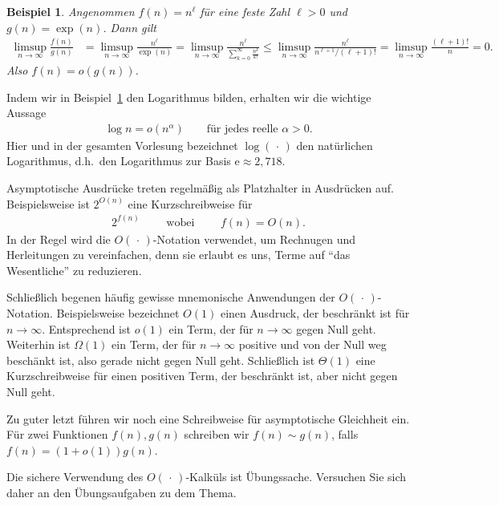 \documentclass[10pt,reqno]{amsart}
\numberwithin{equation}{section}
\newcommand\nix{\,\cdot\,}
\newtheorem{example}[definition]{Beispiel}
\newcommand\eul{\mathrm{e}}
\begin{document}
\begin{example}\upshape\label{ex_exp}
	Angenommen $f(n)=n^\ell$ f\"ur eine feste Zahl $\ell>0$ und $g(n)=\exp(n)$.
	Dann gilt
	\begin{align*}
		\limsup_{n\to\infty}\frac{f(n)}{g(n)}&=\limsup_{n\to\infty}\frac{n^\ell}{\exp(n)}=\limsup_{n\to\infty}\frac{n^\ell}{\sum_{k=0}^\infty\frac{n^k}{k!}}\leq\limsup_{n\to\infty}\frac{n^\ell}{n^{\ell+1}/(\ell+1)!}=\limsup_{n\to\infty}\frac{(\ell+1)!}n=0.
	\end{align*}
	Also $f(n)=o(g(n))$.
\end{example}

Indem wir in Beispiel~\ref{ex_exp} den Logarithmus bilden, erhalten wir die wichtige Aussage
\begin{align*}
	\log n=o(n^\alpha)\qquad\mbox{f\"ur jedes reelle }\alpha>0.
\end{align*}
Hier und in der gesamten Vorlesung bezeichnet $\log(\nix)$ den nat\"urlichen Logarithmus, d.h.\ den Logarithmus zur Basis $\eul\approx2,718$.

Asymptotische Ausdr\"ucke treten regelm\"a\ss ig als Platzhalter in Ausdr\"ucken auf.
Beispielsweise ist $2^{O(n)}$ eine Kurzschreibweise f\"ur
	\begin{align*}
		2^{f(n)}\qquad\mbox{ wobei }\qquad f(n)=O(n).
	\end{align*}
In der Regel wird die $O(\nix)$-Notation verwendet, um Rechnugen und Herleitungen zu vereinfachen, denn sie erlaubt es uns, Terme auf ``das Wesentliche'' zu reduzieren.

Schlie\ss lich begenen h\"aufig gewisse mnemonische Anwendungen der $O(\nix)$-Notation.
Beispielsweise bezeichnet $O(1)$ einen Ausdruck, der beschr\"ankt ist f\"ur $n\to\infty$.
Entsprechend ist $o(1)$ ein Term, der f\"ur $n\to\infty$ gegen Null geht.
Weiterhin ist $\Omega(1)$ ein Term, der f\"ur $n\to\infty$ positive und von der Null weg besch\"ankt ist, also gerade nicht gegen Null geht.
Schlie\ss lich ist $\Theta(1)$ eine Kurzschreibweise f\"ur einen positiven Term, der beschr\"ankt ist, aber nicht gegen Null geht.

Zu guter letzt f\"uhren wir noch eine Schreibweise f\"ur asymptotische Gleichheit ein.
F\"ur zwei Funktionen $f(n),g(n)$ schreiben wir $f(n)\sim g(n)$, falls $f(n)=(1+o(1))g(n)$.

Die sichere Verwendung des $O(\nix)$-Kalk\"uls ist \"Ubungssache.
Versuchen Sie sich daher an den \"Ubungsaufgaben zu dem Thema.
\end{document}
